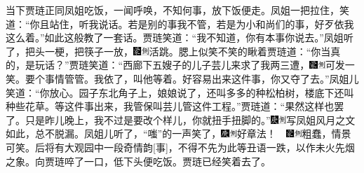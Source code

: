 当下贾琏正同凤姐吃饭，一闻呼唤，不知何事，放下饭便走。凤姐一把拉住，笑道：“你且站住，听我说话。若是别的事我不管，若是为小和尚们的事，好歹依我这么着。”如此这般教了一套话。贾琏笑道：“我不知道，你有本事你说去。”凤姐听了，把头一梗，把筷子一放，{\includegraphics[width=3mm]{../Images/00006}\includegraphics[width=3mm]{../Images/00011}\footnotesize \kaishu 活跳。}腮上似笑不笑的瞅着贾琏道：“你当真的，是玩话？”贾琏笑道：“西廊下五嫂子的儿子芸儿来求了我两三遭，{\includegraphics[width=3mm]{../Images/00006}\includegraphics[width=3mm]{../Images/00011}\footnotesize \kaishu 可发一笑。}要个事情管管。我依了，叫他等着。好容易出来这件事，你又夺了去。”凤姐儿笑道：“你放心。园子东北角子上，娘娘说了，还叫多多的种松柏树，楼底下还叫种些花草。等这件事出来，我管保叫芸儿管这件工程。”贾琏道：“果然这样也罢了。只是昨儿晚上，我不过是要改个样儿，你就扭手扭脚的。”{\includegraphics[width=3mm]{../Images/00004}\includegraphics[width=3mm]{../Images/00011}\footnotesize \kaishu 写凤姐风月之文如此，总不脱漏。}凤姐儿听了，“嗤”的一声笑了，{{\includegraphics[width=3mm]{../Images/00004}\includegraphics[width=3mm]{../Images/00011}\footnotesize \kaishu 好章法！　}\includegraphics[width=3mm]{../Images/00006}\includegraphics[width=3mm]{../Images/00011}\footnotesize \kaishu 粗蠢，情景可笑。后将有大观园中一段奇情韵{[}事{]}，不得不先为此等丑语一跌，以作未火先烟之象。}向贾琏啐了一口，低下头便吃饭。贾琏已经笑着去了。

